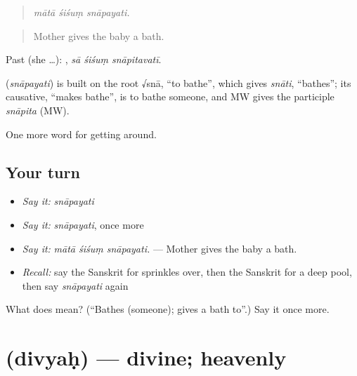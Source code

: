 \begin{quote}
  
\end{quote}

\begin{quote}
\emph{mātā śiśuṃ snāpayati.}
\end{quote}

\begin{quote}
Mother gives the baby a bath.
\end{quote}

Past (she …):   , \emph{sā śiśuṃ snāpitavatī}.

\begin{cousinweb}
\textbf{} (\emph{snāpayati}) is built on the root √snā, \textquotedblleft{}to bathe\textquotedblright{}, which gives \emph{snāti}, \textquotedblleft{}bathes\textquotedblright{}; its causative, \textquotedblleft{}makes bathe\textquotedblright{}, is to bathe someone, and MW gives the participle \emph{snāpita} (MW).
\end{cousinweb}

\begin{grammarlens}[title={What you've built}]
One more word for getting around.
\end{grammarlens}

\subsection*{Your turn}
\begin{itemize}
\raggedright
  \item \emph{Say it:} \emph{snāpayati}
  \item \emph{Say it:} \emph{snāpayati}, once more
  \item \emph{Say it:} \emph{mātā śiśuṃ snāpayati.} — Mother gives the baby a bath.
  \item \emph{Recall:} say the Sanskrit for sprinkles over, then the Sanskrit for a deep pool, then say \emph{snāpayati} again
\end{itemize}

\begin{tcolorbox}[breakable,colback=teal!4,colframe=teal!35!black,title={Before you move on}]
What does  mean? (\textquotedblleft{}Bathes (someone); gives a bath to\textquotedblright{}.) Say it once more.
\end{tcolorbox}
\section[\texorpdfstring{\sk{दिव्यः} (divyaḥ)}{दिव्यः (divyaḥ)}]{ (divyaḥ) — divine; heavenly}

